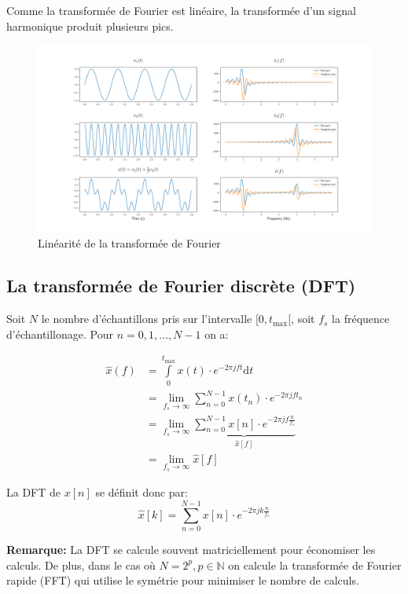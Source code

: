 \documentclass[french,]{article}
\begin{document}
Comme la transformée de Fourier est linéaire, la transformée d'un signal
harmonique produit plusieurs pics.

\begin{figure}
\centering
\includegraphics{../../figures/out/fourier_linearity.png}
\caption{Linéarité de la transformée de Fourier}
\end{figure}

\hypertarget{la-transformee-de-fourier-discrete-dft}{%
\subsection{La transformée de Fourier discrète
(DFT)}\label{la-transformee-de-fourier-discrete-dft}}

Soit \(N\) le nombre d'échantillons pris sur l'intervalle
\([0,t_{\text{max}}[\), soit \(f_s\) la fréquence d'échantillonage. Pour
\(n=0,1,\dots,N-1\) on a:

\begin{align*}
\hat{x}(f) &= \int\limits_{0}^{t_{\text{max}}} x(t)\cdot e^{-2\pi j ft}\mathrm{d}t \\
    &= \lim\limits_{f_s\rightarrow\infty} \sum\limits_{n=0}^{N-1} x(t_n)\cdot e^{-2\pi j ft_n}\\
    &= \lim\limits_{f_s\rightarrow\infty} \underbrace{\sum\limits_{n=0}^{N-1} x[n]\cdot e^{-2\pi j f \frac{n}{f_s}}}_{\hat{x}[f]}\\
    &= \lim\limits_{f_s\rightarrow\infty} \hat{x}[f]
\end{align*}

La DFT de \(x[n]\) se définit donc par:
\[ \hat{x}[k] = \sum\limits_{n=0}^{N-1} x[n]\cdot e^{-2\pi j k \frac{n}{f_s}} \]

\textbf{Remarque:} La DFT se calcule souvent matriciellement pour
économiser les calculs. De plus, dans le cas où \(N=2^p,p\in\mathbb{N}\)
on calcule la transformée de Fourier rapide (FFT) qui utilise le
symétrie pour minimiser le nombre de calculs.
\end{document}
